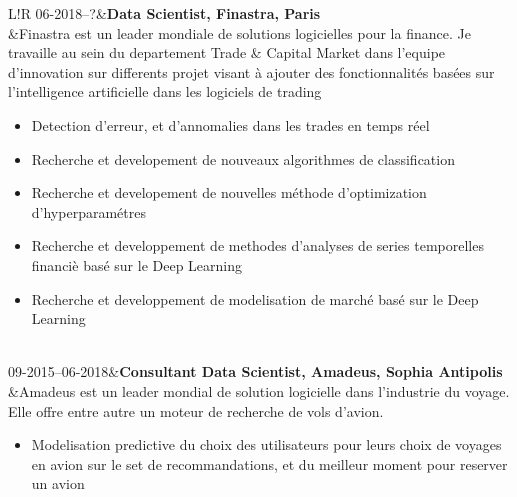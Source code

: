 \documentclass[6pt]{article}
\newcommand\VRule{\color{lightgray}\vrule width 0.5pt}
\begin{document}
\begin{tabular}{L!{\VRule}R}
06-2018--?&\textbf{Data Scientist, Finastra, Paris}\\
	&Finastra est un leader mondiale de solutions logicielles pour la finance. Je travaille au sein du departement Trade \& Capital Market dans l'equipe d'innovation sur differents projet visant \`{a} ajouter des fonctionnalit\'{e}s bas\'{e}es sur l'intelligence artificielle dans les logiciels de trading
	\begin{itemize}
		\item Detection d'erreur, et d'annomalies dans les trades en temps r\'{e}el
		\item Recherche et developement de nouveaux algorithmes de classification
		\item Recherche et developement de nouvelles m\'{e}thode d'optimization d'hyperparam\'{e}tres
		\item Recherche et developpement de methodes d'analyses de series temporelles financi\`{e} bas\'{e} sur le Deep Learning 
		\item Recherche et developpement de modelisation de march\'{e} bas\'{e} sur le Deep Learning
	\end{itemize}
	\\[5pt]
09-2015--06-2018&\textbf{Consultant Data Scientist, Amadeus, Sophia Antipolis}\\
	&Amadeus est un leader mondial de solution logicielle dans l'industrie du voyage. Elle offre entre autre un moteur de recherche de vols d'avion.
\begin{itemize}
	\item Modelisation predictive du choix des utilisateurs pour leurs choix de voyages en avion sur le set de recommandations, et du meilleur moment pour reserver un avion

\end{itemize}
\end{tabular}
\end{document}
